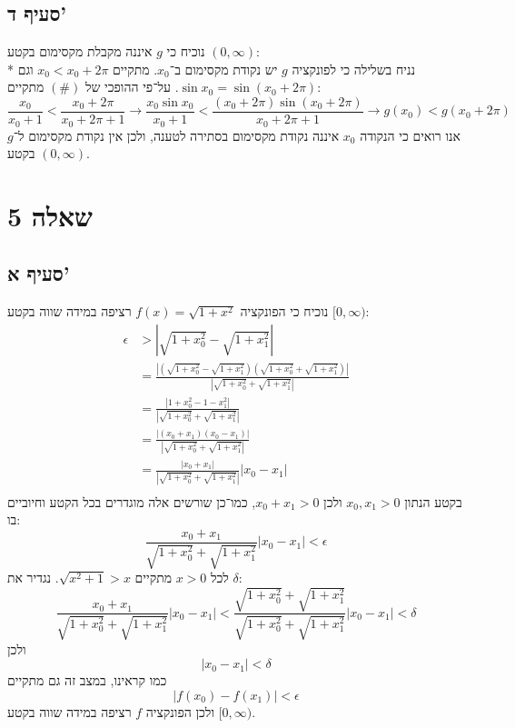 \documentclass[a4paper]{article}
\begin{document}
\subsection{סעיף ד'}
נוכיח כי $g$ איננה מקבלת מקסימום בקטע $(0, \infty)$: \\*
נניח בשלילה כי לפונקציה $g$ יש נקודת מקסימום ב־$x_0$.
מתקיים $x_0 < x_0 + 2\pi$ וגם $\sin x_0 = \sin(x_0 + 2\pi)$.
על־פי ההופכי של $(\#)$ מתקיים:
\[
	\frac{x_0}{x_0 + 1} < \frac{x_0 + 2\pi}{x_0 + 2\pi + 1}
	\rightarrow
	\frac{x_0 \sin x_0}{x_0 + 1} < \frac{(x_0 + 2\pi) \sin(x_0 + 2\pi)}{x_0 + 2\pi + 1}
	\rightarrow
	g(x_0) < g(x_0 + 2\pi)
\]
אנו רואים כי הנקודה $x_0$ איננה נקודת מקסימום בסתירה לטענה,
ולכן אין נקודת מקסימום ל־$g$ בקטע $(0, \infty)$.

\section{שאלה 5}
\subsection{סעיף א'}
נוכיח כי הפונקציה $f(x) = \sqrt{1 + x^2}$ רציפה במידה שווה בקטע $[0, \infty)$: %
\begin{align*}
	\epsilon & > \left| \sqrt{1 + x_0^2} - \sqrt{1 + x_1^2} \right| \\
	& = \frac{\left| \left( \sqrt{1 + x_0^2} - \sqrt{1 + x_1^2} \right) \left( \sqrt{1 + x_0^2} + \sqrt{1 + x_1^2} \right) \right|}
	{\left| \sqrt{1 + x_0^2} + \sqrt{1 + x_1^2} \right|} \\
	& = \frac{\left|  1 + x_0^2 - 1 - x_1^2 \right|} {\left| \sqrt{1 + x_0^2} + \sqrt{1 + x_1^2} \right|} \\
	& = \frac{\left|  (x_0 + x_1)(x_0 - x_1) \right|} {\left| \sqrt{1 + x_0^2} + \sqrt{1 + x_1^2} \right|} \\
	& = \frac{\left|  x_0 + x_1 \right|} {\left| \sqrt{1 + x_0^2} + \sqrt{1 + x_1^2} \right|} |x_0 - x_1| \\
\end{align*}
בקטע הנתון $x_0, x_1 > 0$ ולכן $x_0 + x_1 > 0$, כמו־כן שורשים אלה מוגדרים בכל הקטע וחיוביים בו:
\[
	\frac{x_0 + x_1} {\sqrt{1 + x_0^2} + \sqrt{1 + x_1^2}} |x_0 - x_1| < \epsilon
\]
לכל $x > 0$ מתקיים $\sqrt{x^2 + 1} > x$.
נגדיר את $\delta$:
\[
	\frac{x_0 + x_1} {\sqrt{1 + x_0^2} + \sqrt{1 + x_1^2}} |x_0 - x_1| < 
	\frac{\sqrt{1 + x_0^2} + \sqrt{1 + x_1^2}}{\sqrt{1 + x_0^2} + \sqrt{1 + x_1^2}} |x_0 - x_1| < \delta
\]
ולכן
\[
	|x_0 - x_1| < \delta
\]
כמו קראינו, במצב זה גם מתקיים
\[
	|f(x_0) - f(x_1)| < \epsilon
\]
ולכן הפונקציה $f$ רציפה במידה שווה בקטע $[0, \infty)$. %
\end{document}
